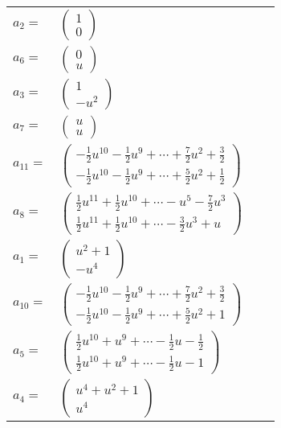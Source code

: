 \documentclass[1p]{elsarticle_modified}
\theoremstyle{definition}
\begin{document}
\begin{tabular}{m{7pt} m{180pt} m{7pt} m{180pt} }
\flushright $a_{2}=$&$\begin{pmatrix}1\\0\end{pmatrix}$ \\
\flushright $a_{6}=$&$\begin{pmatrix}0\\u\end{pmatrix}$ \\
\flushright $a_{3}=$&$\begin{pmatrix}1\\- u^2\end{pmatrix}$ \\
\flushright $a_{7}=$&$\begin{pmatrix}u\\u\end{pmatrix}$ \\
\flushright $a_{11}=$&$\begin{pmatrix}-\frac{1}{2} u^{10}-\frac{1}{2} u^9+\cdots+\frac{7}{2} u^2+\frac{3}{2}\\-\frac{1}{2} u^{10}-\frac{1}{2} u^9+\cdots+\frac{5}{2} u^2+\frac{1}{2}\end{pmatrix}$ \\
\flushright $a_{8}=$&$\begin{pmatrix}\frac{1}{2} u^{11}+\frac{1}{2} u^{10}+\cdots- u^5-\frac{7}{2} u^3\\\frac{1}{2} u^{11}+\frac{1}{2} u^{10}+\cdots-\frac{3}{2} u^3+u\end{pmatrix}$ \\
\flushright $a_{1}=$&$\begin{pmatrix}u^2+1\\- u^4\end{pmatrix}$ \\
\flushright $a_{10}=$&$\begin{pmatrix}-\frac{1}{2} u^{10}-\frac{1}{2} u^9+\cdots+\frac{7}{2} u^2+\frac{3}{2}\\-\frac{1}{2} u^{10}-\frac{1}{2} u^9+\cdots+\frac{5}{2} u^2+1\end{pmatrix}$ \\
\flushright $a_{5}=$&$\begin{pmatrix}\frac{1}{2} u^{10}+u^9+\cdots-\frac{1}{2} u-\frac{1}{2}\\\frac{1}{2} u^{10}+u^9+\cdots-\frac{1}{2} u-1\end{pmatrix}$ \\
\flushright $a_{4}=$&$\begin{pmatrix}u^4+u^2+1\\u^4\end{pmatrix}$ \\

\end{tabular}
\end{document}
